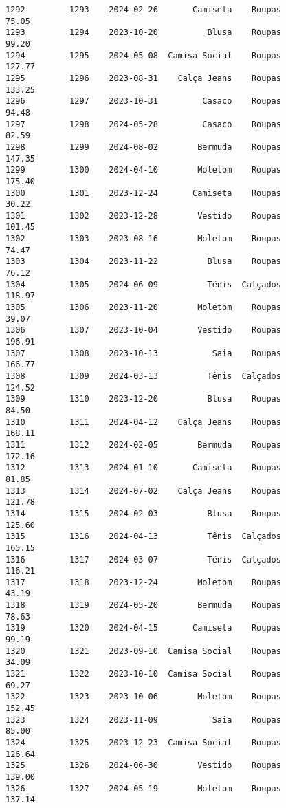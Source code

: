\documentclass[11pt]{article}
\begin{document}
\begin{Verbatim}[commandchars=\\\{\}]
1292         1293    2024-02-26       Camiseta    Roupas           75.05   
1293         1294    2023-10-20          Blusa    Roupas           99.20   
1294         1295    2024-05-08  Camisa Social    Roupas          127.77   
1295         1296    2023-08-31    Calça Jeans    Roupas          133.25   
1296         1297    2023-10-31         Casaco    Roupas           94.48   
1297         1298    2024-05-28         Casaco    Roupas           82.59   
1298         1299    2024-08-02        Bermuda    Roupas          147.35   
1299         1300    2024-04-10        Moletom    Roupas          175.40   
1300         1301    2023-12-24       Camiseta    Roupas           30.22   
1301         1302    2023-12-28        Vestido    Roupas          101.45   
1302         1303    2023-08-16        Moletom    Roupas           74.47   
1303         1304    2023-11-22          Blusa    Roupas           76.12   
1304         1305    2024-06-09          Tênis  Calçados          118.97   
1305         1306    2023-11-20        Moletom    Roupas           39.07   
1306         1307    2023-10-04        Vestido    Roupas          196.91   
1307         1308    2023-10-13           Saia    Roupas          166.77   
1308         1309    2024-03-13          Tênis  Calçados          124.52   
1309         1310    2023-12-20          Blusa    Roupas           84.50   
1310         1311    2024-04-12    Calça Jeans    Roupas          168.11   
1311         1312    2024-02-05        Bermuda    Roupas          172.16   
1312         1313    2024-01-10       Camiseta    Roupas           81.85   
1313         1314    2024-07-02    Calça Jeans    Roupas          121.78   
1314         1315    2024-02-03          Blusa    Roupas          125.60   
1315         1316    2024-04-13          Tênis  Calçados          165.15   
1316         1317    2024-03-07          Tênis  Calçados          116.21   
1317         1318    2023-12-24        Moletom    Roupas           43.19   
1318         1319    2024-05-20        Bermuda    Roupas           78.63   
1319         1320    2024-04-15       Camiseta    Roupas           99.19   
1320         1321    2023-09-10  Camisa Social    Roupas           34.09   
1321         1322    2023-10-10  Camisa Social    Roupas           69.27   
1322         1323    2023-10-06        Moletom    Roupas          152.45   
1323         1324    2023-11-09           Saia    Roupas           85.00   
1324         1325    2023-12-23  Camisa Social    Roupas          126.64   
1325         1326    2024-06-30        Vestido    Roupas          139.00   
1326         1327    2024-05-19        Moletom    Roupas          137.14   

\end{Verbatim}
\end{document}
